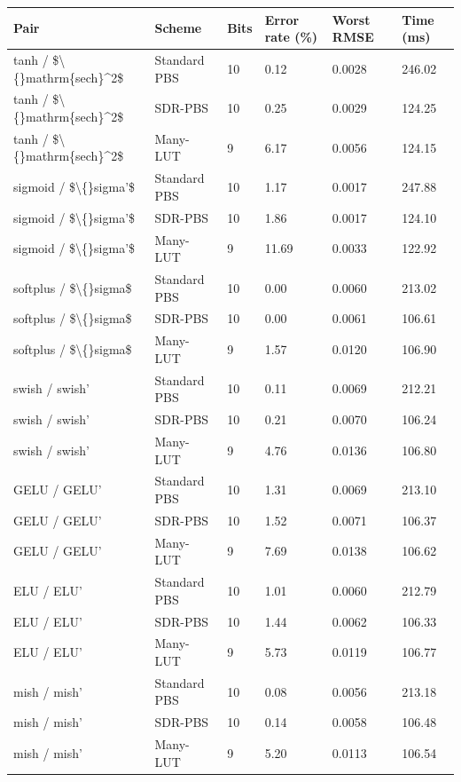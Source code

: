 \small
\setlength{\tabcolsep}{4pt}
\begin{tabular}{llllll}
\toprule
Pair & Scheme & Bits & Error rate (\%) & Worst RMSE & Time (ms) \\
\midrule
tanh / \$\textbackslash\{\}mathrm\{sech\}^2\$ & Standard PBS & 10 & 0.12 & 0.0028 & 246.02 \\
tanh / \$\textbackslash\{\}mathrm\{sech\}^2\$ & SDR-PBS & 10 & 0.25 & 0.0029 & 124.25 \\
tanh / \$\textbackslash\{\}mathrm\{sech\}^2\$ & Many-LUT & 9 & 6.17 & 0.0056 & 124.15 \\
sigmoid / \$\textbackslash\{\}sigma'\$ & Standard PBS & 10 & 1.17 & 0.0017 & 247.88 \\
sigmoid / \$\textbackslash\{\}sigma'\$ & SDR-PBS & 10 & 1.86 & 0.0017 & 124.10 \\
sigmoid / \$\textbackslash\{\}sigma'\$ & Many-LUT & 9 & 11.69 & 0.0033 & 122.92 \\
softplus / \$\textbackslash\{\}sigma\$ & Standard PBS & 10 & 0.00 & 0.0060 & 213.02 \\
softplus / \$\textbackslash\{\}sigma\$ & SDR-PBS & 10 & 0.00 & 0.0061 & 106.61 \\
softplus / \$\textbackslash\{\}sigma\$ & Many-LUT & 9 & 1.57 & 0.0120 & 106.90 \\
swish / swish' & Standard PBS & 10 & 0.11 & 0.0069 & 212.21 \\
swish / swish' & SDR-PBS & 10 & 0.21 & 0.0070 & 106.24 \\
swish / swish' & Many-LUT & 9 & 4.76 & 0.0136 & 106.80 \\
GELU / GELU' & Standard PBS & 10 & 1.31 & 0.0069 & 213.10 \\
GELU / GELU' & SDR-PBS & 10 & 1.52 & 0.0071 & 106.37 \\
GELU / GELU' & Many-LUT & 9 & 7.69 & 0.0138 & 106.62 \\
ELU / ELU' & Standard PBS & 10 & 1.01 & 0.0060 & 212.79 \\
ELU / ELU' & SDR-PBS & 10 & 1.44 & 0.0062 & 106.33 \\
ELU / ELU' & Many-LUT & 9 & 5.73 & 0.0119 & 106.77 \\
mish / mish' & Standard PBS & 10 & 0.08 & 0.0056 & 213.18 \\
mish / mish' & SDR-PBS & 10 & 0.14 & 0.0058 & 106.48 \\
mish / mish' & Many-LUT & 9 & 5.20 & 0.0113 & 106.54 \\
\bottomrule
\end{tabular}
